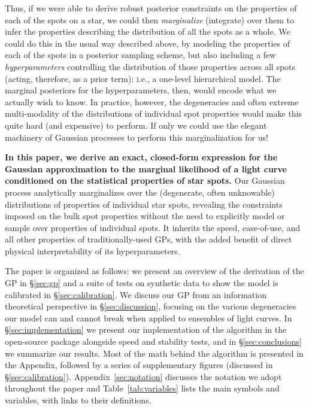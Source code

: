 \documentclass[modern]{aastex62}
\begin{document}
Thus, if we were able to derive robust posterior constraints
on the properties of each of the spots on a star, we could then
\emph{marginalize} (integrate) over them to infer the properties
describing the distribution of all the spots as a whole.
We could do this in the usual way described above, by
modeling the properties of each of the spots in a posterior sampling
scheme, but also including a few
\emph{hyperparameters} controlling the distribution of those properties
across all spots (acting, therefore, as a prior term): i.e., a one-level
hierarchical model. The marginal posteriors for the hyperparameters, then,
would encode what we actually wish to know.
%
In practice, however, the degeneracies and often extreme multi-modality
of the distributions of individual spot properties would make this
quite hard (and expensive) to perform.
%
If only we could use the elegant machinery of Gaussian processes to
perform this marginalization for us!

\textbf{In this paper, we derive an exact, closed-form expression for
    the Gaussian approximation to the marginal likelihood of a light curve
    conditioned on the statistical properties of star spots.} Our Gaussian
process analytically marginalizes over the (degenerate, often unknowable)
distributions of properties of individual star spots, revealing the
constraints imposed on the bulk spot properties without the need to
explicitly model or sample over properties of individual spots. It inherits
the speed, ease-of-use, and all other properties of traditionally-used
GPs, with the added benefit of direct physical interpretability of its
hyperparameters.
%

The paper is organized as follows:
we present an overview of the derivation of the GP in \S\ref{sec:gp}
and a suite of tests on synthetic data to show the model is calibrated
in \S\ref{sec:calibration}. We discuss our GP from an information
theoretical perspective in \S\ref{sec:discussion}, focusing on
the various degeneracies our model can and cannot break when applied
to ensembles of light curves. In \S\ref{sec:implementation} we present
our implementation of the algorithm in the open-source \starryprocess package
alongside speed and stability tests, and in \S\ref{sec:conclusions} we
summarize our results. Most of the math behind the algorithm
is presented in the Appendix, followed by a series of supplementary figures
(discussed in \S\ref{sec:calibration}). Appendix~\ref{sec:notation} discusses the
notation we adopt throughout the paper and Table~\ref{tab:variables}
lists the main symbols and variables, with links to their definitions.
\end{document}
